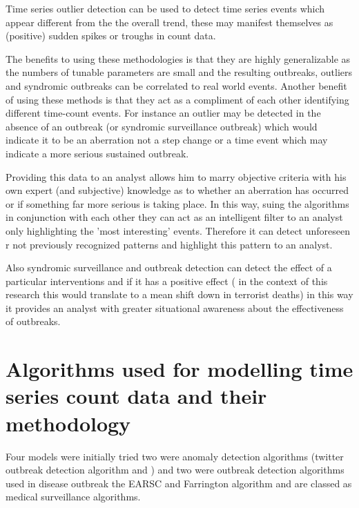 Time series outlier detection can be used to detect time series events which appear different from the the overall trend, these may manifest themselves as (positive) sudden spikes or troughs in count data.

The benefits to using these methodologies is that they are highly generalizable as the numbers of tunable parameters are small and the resulting outbreaks, outliers and syndromic outbreaks can be correlated to real world events. Another benefit of using these methods is that they act as a compliment of each other
identifying different time-count events. For instance an outlier may be detected in the absence of an outbreak (or syndromic surveillance outbreak)
which would indicate it to be an aberration not a step change or a time event which may indicate a more serious sustained outbreak.

Providing this data to an analyst allows him to marry objective criteria with his own expert (and subjective) knowledge as to whether an aberration has occurred or if something far more serious is taking place. In this way, suing the algorithms in conjunction with each other they can act as an intelligent filter to an analyst only highlighting the 'most interesting' events. Therefore it can detect unforeseen r not previously recognized patterns and highlight this pattern to an analyst.

Also syndromic surveillance and outbreak detection can detect the effect of a particular interventions and if it has a positive effect ( in the context of this research this would translate to a mean shift down in terrorist deaths) in this  way it provides an analyst with greater situational awareness about the effectiveness of outbreaks. 

\section{Algorithms used for modelling time series count data and their methodology}

Four models were initially tried two were anomaly detection algorithms (twitter outbreak detection algorithm and ) and two were outbreak detection algorithms used in disease outbreak the EARSC and Farrington algorithm and are classed as medical surveillance algorithms. 

